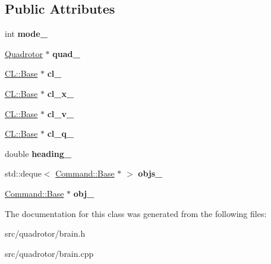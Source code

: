 \subsection*{\-Public \-Attributes}
\begin{DoxyCompactItemize}
\item 
\hypertarget{classBrain_a909cbf59a243e11be1e052dfebc1039f}{int {\bfseries mode\-\_\-}}\label{classBrain_a909cbf59a243e11be1e052dfebc1039f}

\item 
\hypertarget{classBrain_a522cd8559636661c43d07aa86e9803b7}{\hyperlink{classQuadrotor}{\-Quadrotor} $\ast$ {\bfseries quad\-\_\-}}\label{classBrain_a522cd8559636661c43d07aa86e9803b7}

\item 
\hypertarget{classBrain_a0897765690afb51c87d037329e968464}{\hyperlink{classCL_1_1Base}{\-C\-L\-::\-Base} $\ast$ {\bfseries cl\-\_\-}}\label{classBrain_a0897765690afb51c87d037329e968464}

\item 
\hypertarget{classBrain_aa408572807d4347bd4a7e3bee61ee75e}{\hyperlink{classCL_1_1Base}{\-C\-L\-::\-Base} $\ast$ {\bfseries cl\-\_\-x\-\_\-}}\label{classBrain_aa408572807d4347bd4a7e3bee61ee75e}

\item 
\hypertarget{classBrain_af283fe2f0a5ee9cb117cc393a0028993}{\hyperlink{classCL_1_1Base}{\-C\-L\-::\-Base} $\ast$ {\bfseries cl\-\_\-v\-\_\-}}\label{classBrain_af283fe2f0a5ee9cb117cc393a0028993}

\item 
\hypertarget{classBrain_a962d23b524a3bf3668eb3f6bdf5be20e}{\hyperlink{classCL_1_1Base}{\-C\-L\-::\-Base} $\ast$ {\bfseries cl\-\_\-q\-\_\-}}\label{classBrain_a962d23b524a3bf3668eb3f6bdf5be20e}

\item 
\hypertarget{classBrain_a839638574da324a41c61edd5375a7261}{double {\bfseries heading\-\_\-}}\label{classBrain_a839638574da324a41c61edd5375a7261}

\item 
\hypertarget{classBrain_a9e99f325288e528a5893ff37dce19ec7}{std\-::deque$<$ \hyperlink{classCommand_1_1Base}{\-Command\-::\-Base} $\ast$ $>$ {\bfseries objs\-\_\-}}\label{classBrain_a9e99f325288e528a5893ff37dce19ec7}

\item 
\hypertarget{classBrain_add3bf09bdcdd4cfc8008d076b1859f5f}{\hyperlink{classCommand_1_1Base}{\-Command\-::\-Base} $\ast$ {\bfseries obj\-\_\-}}\label{classBrain_add3bf09bdcdd4cfc8008d076b1859f5f}

\end{DoxyCompactItemize}


\-The documentation for this class was generated from the following files\-:\begin{DoxyCompactItemize}
\item 
src/quadrotor/brain.\-h\item 
src/quadrotor/brain.\-cpp\end{DoxyCompactItemize}
